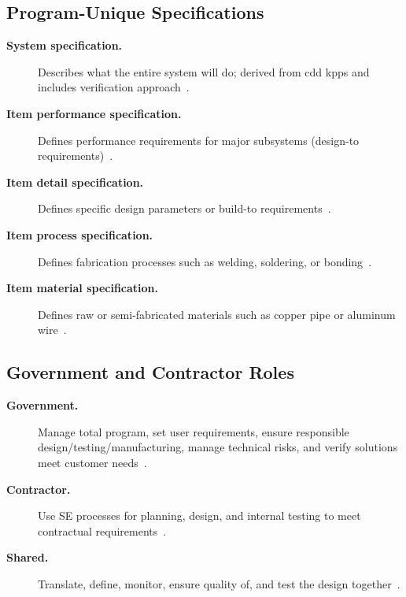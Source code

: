 \documentclass[../main.tex]{subfiles}
\begin{document}
\subsection{Program-Unique Specifications}
\begin{description}
  \item[\textbf{System specification.}] Describes what the entire system will do; derived from \ac{cdd} \acp{kpp} and includes verification approach~\autocite{edo-3-5-1-systems-engineering-overview-2025}.
  \item[\textbf{Item performance specification.}] Defines performance requirements for major subsystems (design-to requirements)~\autocite{edo-3-5-1-systems-engineering-overview-2025}.
  \item[\textbf{Item detail specification.}] Defines specific design parameters or build-to requirements~\autocite{edo-3-5-1-systems-engineering-overview-2025}.
  \item[\textbf{Item process specification.}] Defines fabrication processes such as welding, soldering, or bonding~\autocite{edo-3-5-1-systems-engineering-overview-2025}.
  \item[\textbf{Item material specification.}] Defines raw or semi-fabricated materials such as copper pipe or aluminum wire~\autocite{edo-3-5-1-systems-engineering-overview-2025}.
\end{description}

\subsection{Government and Contractor Roles}
\begin{description}
  \item[\textbf{Government.}] Manage total program, set user requirements, ensure responsible design/testing/manufacturing, manage technical risks, and verify solutions meet customer needs~\autocite{edo-3-5-1-systems-engineering-overview-2025}.
  \item[\textbf{Contractor.}] Use SE processes for planning, design, and internal testing to meet contractual requirements~\autocite{edo-3-5-1-systems-engineering-overview-2025}.
  \item[\textbf{Shared.}] Translate, define, monitor, ensure quality of, and test the design together~\autocite{edo-3-5-1-systems-engineering-overview-2025}.
\end{description}
\end{document}
